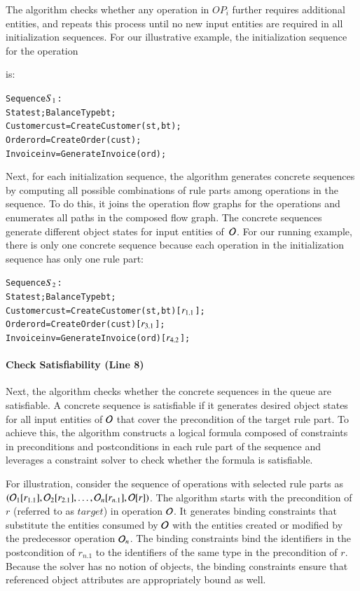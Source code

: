 The algorithm checks whether any operation in $OP_i$ further requires additional
entities, and repeats this process until no new input entities are required in
all initialization sequences.  For our illustrative example, the initialization
sequence for the operation \subject{GenerateInvoice} is:

\vspace*{-4pt}
{\scriptsize
\begin{alltt}
 Sequence \(S\sb{1}\):
 State st; BalanceType bt;
 Customer cust = CreateCustomer(st, bt);  
 Order ord = CreateOrder(cust);
 Invoice inv = GenerateInvoice(ord);  
\end{alltt}
}
\vspace*{-5pt}

Next, for each initialization sequence, the algorithm generates concrete
sequences by computing all possible combinations of rule parts among operations
in the sequence. To do this, it joins the operation flow graphs for the
operations and enumerates all paths in the composed flow graph. The concrete
sequences generate different object states for input entities of~${\cal O}$. For
our running example, there is only one concrete sequence because each operation
in the initialization sequence has only one rule part:

\vspace*{-4pt}
{\scriptsize
\begin{alltt}
 Sequence \(S\sb{2}\):
 State st; BalanceType bt;
 Customer cust = CreateCustomer(st, bt) [\(r\sb{1.1}\)];
 Order ord = CreateOrder(cust) [\(r\sb{3.1}\)];	
 Invoice inv = GenerateInvoice(ord) [\(r\sb{4.2}\)];  
\end{alltt}
}
\vspace*{-5pt}

\paragraph*{Check Satisfiability (Line 8)} Next, the algorithm checks whe\-ther 
the concrete sequences in the queue are satisfiable. A concrete sequence is
satisfiable if it generates desired object states for all input entities of
${\cal O}$ that cover the precondition of the target rule part. To achieve this,
the algorithm constructs a logical formula composed of constraints in
preconditions and postconditions in each rule part of the sequence and leverages
a constraint solver to check whether the formula is satisfiable.

For illustration, consider the sequence of operations with selected rule parts
as $({\cal O}_1 [r_{1.1}], {\cal O}_2 [r_{2.1}], \ldots, {\cal O}_n [r_{n.1}],
{\cal O} [r])$.  The algorithm starts with the precondition of $r$ (referred to
as $target$) in operation ${\cal O}$.  It generates binding constraints that
substitute the entities consumed by ${\cal O}$ with the entities created or
modified by the predecessor operation ${\cal O}_n$. The binding constraints bind
the identifiers in the postcondition of $r_{n.1}$ to the identifiers of the same
type in the precondition of $r$. Because the solver has no notion of objects,
the binding constraints ensure that referenced object attributes are
appropriately bound as well.

